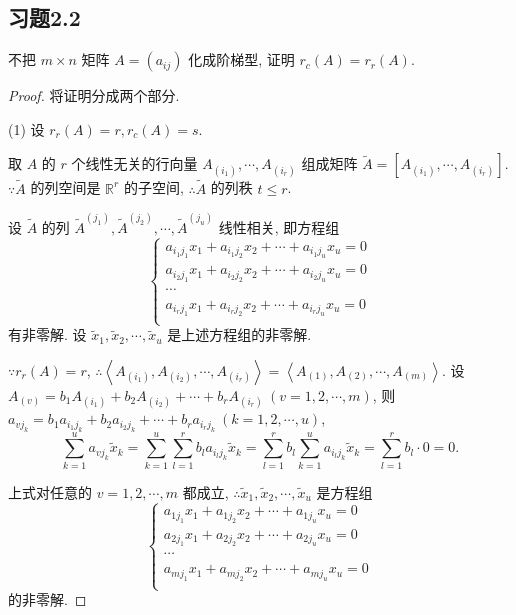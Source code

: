 \documentclass[color=black,device=normal,lang=cn,mode=geye]{elegantnote}
\begin{document}
\subsection{习题2.2}
\begin{exercise}%
    不把 $m\times n$ 矩阵 $A=(a_{ij})$ 化成阶梯型, 证明 $r_c(A)=r_r(A)$.
\end{exercise}
\begin{proof}
    将证明分成两个部分.

    (1) 设 $r_r(A)=r,r_c(A)=s$.
    
    取 $A$ 的 $r$ 个线性无关的行向量 $A_{(i_1)},\cdots,A_{(i_r)}$ 组成矩阵 $\widetilde{A}=[A_{(i_1)},\cdots,A_{(i_r)}]$. $\because\widetilde{A}$ 的列空间是 $\mathbb{R}^r$ 的子空间, $\therefore\widetilde{A}$ 的列秩 $t\leq r$.

    设 $\widetilde{A}$ 的列 $\widetilde{A}^{(j_1)},\widetilde{A}^{(j_2)},\cdots,\widetilde{A}^{(j_u)}$ 线性相关, 即方程组
    \[\begin{cases}
        a_{i_1j_1}x_1+a_{i_1j_2}x_2+\cdots+a_{i_1j_u}x_u=0 \\
        a_{i_2j_1}x_1+a_{i_2j_2}x_2+\cdots+a_{i_2j_u}x_u=0 \\
        \cdots \\
        a_{i_rj_1}x_1+a_{i_rj_2}x_2+\cdots+a_{i_rj_u}x_u=0 \\
    \end{cases}\]
    有非零解. 设 $\tilde{x}_1,\tilde{x}_2,\cdots,\tilde{x}_u$ 是上述方程组的非零解.

    $\because r_r(A)=r$, $\therefore\left<A_{(i_1)},A_{(i_2)},\cdots,A_{(i_r)}\right>=\left<A_{(1)},A_{(2)},\cdots,A_{(m)}\right>$. 设 $A_{(v)}=b_1A_{(i_1)}+b_2A_{(i_2)}+\cdots+b_rA_{(i_r)}\ (v=1,2,\cdots,m)$, 则 $a_{vj_k}=b_1a_{i_1j_k}+b_2a_{i_2j_k}+\cdots+b_ra_{i_rj_k}\ (k=1,2,\cdots,u)$,
    \[\sum\limits_{k=1}^ua_{vj_k}\tilde{x}_k=\sum\limits_{k=1}^u\sum\limits_{l=1}^rb_la_{i_lj_k}\tilde{x}_k=\sum\limits_{l=1}^rb_l\sum\limits_{k=1}^ua_{i_lj_k}\tilde{x}_k=\sum\limits_{l=1}^rb_l\cdot0=0.\]

    上式对任意的 $v=1,2,\cdots,m$ 都成立, $\therefore\tilde{x}_1,\tilde{x}_2,\cdots,\tilde{x}_u$ 是方程组
    \[\begin{cases}
        a_{1j_1}x_1+a_{1j_2}x_2+\cdots+a_{1j_u}x_u=0 \\
        a_{2j_1}x_1+a_{2j_2}x_2+\cdots+a_{2j_u}x_u=0 \\
        \cdots \\
        a_{mj_1}x_1+a_{mj_2}x_2+\cdots+a_{mj_u}x_u=0 \\
    \end{cases}\]
    的非零解.
    

\end{proof}
\end{document}
